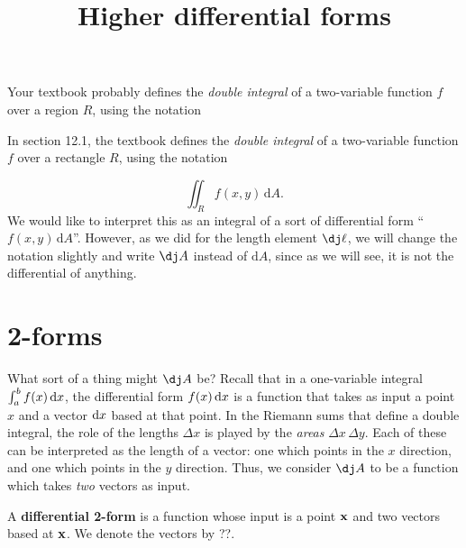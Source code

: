 \documentclass[12pt]{amsart}
\title{Higher differential forms}
\begin{document}
\maketitle

\begin{notextbook}
  Your textbook probably defines the \emph{double integral} of a two-variable function $f$ over a region $R$, using the notation
\end{notextbook}
\begin{stewart}
  In section 12.1, the textbook defines the \emph{double integral} of a two-variable function $f$ over a rectangle $R$, using the notation
\end{stewart}
\[ \iint_R f(x,y) \,\mathrm{d}A. \]
We would like to interpret this as an integral of a sort of differential form ``$f(x,y) \,\mathrm{d}A$''.
However, as we did for the length element $\dl$, we will change the notation slightly and write $\dA$ instead of $\mathrm{d}A$, since as we will see, it is not the differential of anything.

\section{2-forms}
\label{sec:2-forms}

What sort of a thing might $\dA$ be?
Recall that in a one-variable integral $\int_a^b f(x)\,{\mathrm{d} x}$, the differential form $f(x)\,{\mathrm{d} x}$ is a function that takes as input a point $x$ and a vector ${\mathrm{d} x}$ based at that point.
In the Riemann sums that define a double integral, the role of the lengths $\Delta x$ is played by the \emph{areas} $\Delta x \,\Delta y$.
Each of these can be interpreted as the length of a vector: one which points in the $x$ direction, and one which points in the $y$ direction.
Thus, we consider $\dA$ to be a function which takes \emph{two} vectors as input.

\begin{defn}
  A \textbf{differential 2-form} is a function whose input is a point $\mathbf{x}$ and two vectors based at $\mathbf{x}$.
  We denote the vectors by ??.
\end{defn}
\end{document}
